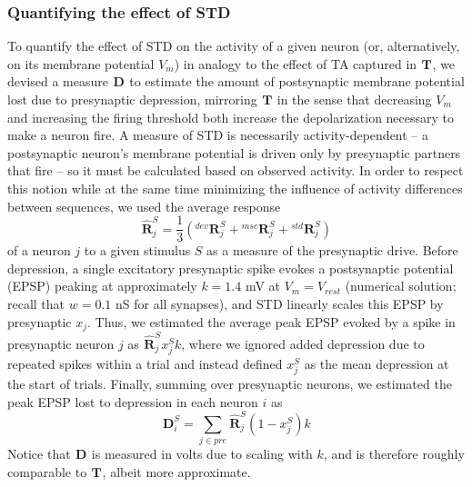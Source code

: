 \documentclass[9pt,lineno,onehalfspacing]{elife}
\newcommand{\R}[3][]{{}^{#1}_{}\boldsymbol R^{#2}_{#3}}
\newcommand{\T}[3][]{{}^{#1}_{}\boldsymbol T^{#2}_{#3}}
\newcommand{\D}[3][]{{}^{#1}_{}\boldsymbol D^{#2}_{#3}}
\newcommand{\Rhat}[3][]{{}^{#1}_{}\widehat{\boldsymbol R}^{#2}_{#3}}
\begin{document}
\subsubsection{Quantifying the effect of STD}\label{sec:D}
To quantify the effect of STD on the activity of a given neuron (or, alternatively, on its membrane potential $V_m$) in analogy to the effect of TA captured in $\T{}{}$, we devised a measure $\D{}{}$ to estimate the amount of postsynaptic membrane potential lost due to presynaptic depression, mirroring $\T{}{}$ in the sense that decreasing $V_m$ and increasing the firing threshold both increase the depolarization necessary to make a neuron fire. A measure of STD is necessarily activity-dependent -- a postsynaptic neuron's membrane potential is driven only by presynaptic partners that fire -- so it must be calculated based on observed activity. In order to respect this notion while at the same time minimizing the influence of activity differences between sequences, we used the average response
\begin{equation}
    \Rhat{S}{j} = \frac{1}{3} (\R[dev]{S}{j} + \R[msc]{S}{j} + \R[std]{S}{j}) \label{eq:Rhat}
\end{equation}
of a neuron $j$ to a given stimulus $S$ as a measure of the presynaptic drive. Before depression, a single excitatory presynaptic spike evokes a postsynaptic potential (EPSP) peaking at approximately $k = 1.4$ mV at $V_m = V_{rest}$ (numerical solution; recall that $w = 0.1$ nS for all synapses), and STD linearly scales this EPSP by presynaptic $x_j$. Thus, we estimated the average peak EPSP evoked by a spike in presynaptic neuron $j$ as $\Rhat{S}{j} x_j^S k$, where we ignored added depression due to repeated spikes within a trial and instead defined $x_j^S$ as the mean depression at the start of trials. Finally, summing over presynaptic neurons, we estimated the peak EPSP lost to depression in each neuron $i$ as
\begin{equation}
    \D{S}{i} = \sum_{j \in pre} \Rhat{S}{j} (1-x_j^S) k \label{eq:D}
\end{equation}
Notice that $\D{}{}$ is measured in volts due to scaling with $k$, and is therefore roughly comparable to $\T{}{}$, albeit more approximate.
\end{document}
